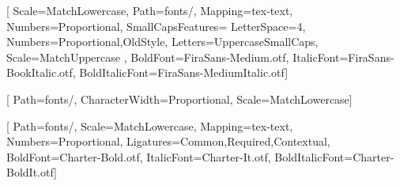 \newfontfamily{}[
	Scale=MatchLowercase,
    Path=fonts/,
    Mapping=tex-text,
    Numbers={Proportional},
    SmallCapsFeatures={
    	LetterSpace=4,
    	Numbers={Proportional,OldStyle},
        Letters=UppercaseSmallCaps,
        Scale=MatchUppercase
        },
    BoldFont=FiraSans-Medium.otf,
    ItalicFont=FiraSans-BookItalic.otf,
    BoldItalicFont=FiraSans-MediumItalic.otf]

\newfontfamily{}[
	Path=fonts/,
    CharacterWidth={Proportional},
    Scale=MatchLowercase]

\newfontfamily{}[
	Path=fonts/,
    Scale=MatchLowercase,
    Mapping=tex-text,
    Numbers={Proportional},
    Ligatures={Common,Required,Contextual},
    BoldFont=Charter-Bold.otf,
    ItalicFont=Charter-It.otf,
    BoldItalicFont=Charter-BoldIt.otf]


\newcommand*{\myfont}{\fontfamily{cmr}\selectfont}

